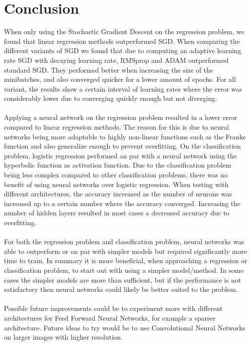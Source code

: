\documentclass[a4paper,twocolumn]{article}
\begin{document}
\section{Conclusion}
When only using the Stochastic Gradient Descent on the regression problem, we found that linear regression methods outperformed SGD. When comparing the different variants of SGD we found that due to computing an adaptive learning rate SGD with decaying learning rate, RMSprop and ADAM outperformed standard SGD. They performed better when increasing the size of the minibatches, and also converged quicker for a lower amount of epochs. For all variant, the results show a certain interval of learning rates where the error was considerably lower due to converging quickly enough but not diverging.\\
\\
Applying a neural network on the regression problem resulted in a lower error compared to linear regression methods. The reason for this is due to neural networks being more adaptable to highly non-linear functions such as the Franke function and also generalize enough to prevent overfitting. On the classification problem, logistic regression performed an par with a neural network using the hyperbolic function as activation function. Due to the classification problem being less complex compared to other classification problems, there was no benefit of using neural networks over logistic regression. When testing with different architectures, the accuracy increased as the number of neurons was increased up to a certain number where the accuracy converged. Increasing the number of hidden layers resulted in most cases a decreased accuracy due to overfitting. \\
\\
For both the regression problem and classification problem, neural networks was able to outperform or on par with simpler models but required significantly more time to train. In summary it is more beneficial, when approaching a regression or classification problem, to start out with using a simpler model/method. In some cases the simpler models are more than sufficient, but if the performance is not satisfactory then neural networks could likely be better suited to the problem.\\
\\
Possible future improvements could be to experiment more with different architectures for Feed Forward Neural Networks, for example a sparser architecture. Future ideas to try would be to use Convolutional Neural Networks on larger images with higher resolution.
\end{document}
